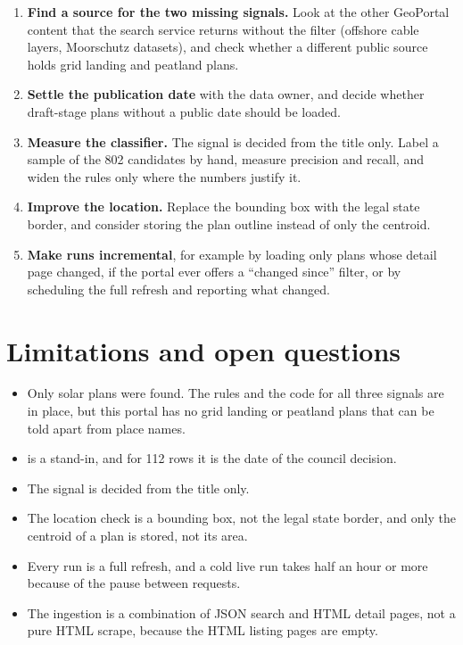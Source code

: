 \documentclass[11pt,a4paper]{article}
\newcommand{\code}[1]{{\small\codeurl{#1}}}
\begin{document}
\begin{enumerate}
\item \textbf{Find a source for the two missing signals.} Look at the other GeoPortal content that the search service
  returns without the \code{type=Bauleitplan} filter (offshore cable layers, Moorschutz datasets), and check whether a
  different public source holds grid landing and peatland plans.
\item \textbf{Settle the publication date} with the data owner, and decide whether draft-stage plans without a public date
  should be loaded.
\item \textbf{Measure the classifier.} The signal is decided from the title only. Label a sample of the 802 candidates by
  hand, measure precision and recall, and widen the rules only where the numbers justify it.
\item \textbf{Improve the location.} Replace the bounding box with the legal state border, and consider storing the
  plan outline instead of only the centroid.
\item \textbf{Make runs incremental}, for example by loading only plans whose detail page changed, if the portal ever
  offers a ``changed since'' filter, or by scheduling the full refresh and reporting what changed.
\end{enumerate}

\section{Limitations and open questions}\label{sec:open}

\begin{itemize}
\item Only solar plans were found. The rules and the code for all three signals are in place, but this portal has no
  grid landing or peatland plans that can be told apart from place names.
\item \code{published_at} is a stand-in, and for 112 rows it is the date of the council decision.
\item The signal is decided from the title only.
\item The location check is a bounding box, not the legal state border, and only the centroid of a plan is stored, not its area.
\item Every run is a full refresh, and a cold live run takes half an hour or more because of the pause between requests.
\item The ingestion is a combination of JSON search and HTML detail pages, not a pure HTML scrape, because the HTML
  listing pages are empty.
\end{itemize}
\end{document}
